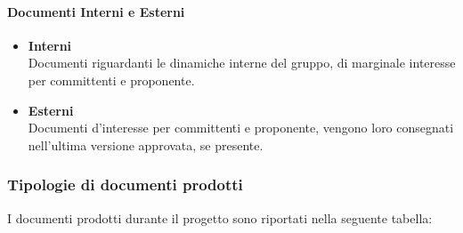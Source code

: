 			\paragraph{Documenti Interni e Esterni}
				\begin{itemize}
					\item\textbf{Interni}\\
						Documenti riguardanti le dinamiche interne del gruppo, di marginale interesse per committenti e proponente.

					\item\textbf{Esterni}\\
						Documenti d’interesse per committenti e proponente, vengono loro consegnati nell’ultima versione approvata, se presente. 
				\end{itemize}			
		\subsubsection{Tipologie di documenti prodotti}
			I documenti prodotti durante il progetto sono riportati nella seguente tabella: 

